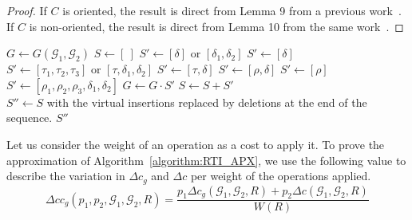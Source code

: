 \documentclass[12pt]{article}
\begin{document}
\begin{proof}
If $C$ is oriented, the result is direct from Lemma 9 from a previous work~\cite{2022b-alexandrino-etal}. If $C$ is non-oriented, the result is direct from Lemma 10 from the same work~\cite{2022b-alexandrino-etal}.
\end{proof}

\begin{algorithm}
\caption{The input is a pair of genomes $\mathcal{G}_1$ and $\mathcal{G}_2$. The output is a sequence $S''$ of reversal, transposition and indel operations such that $\mathcal{G}_1
  \cdot S'' = \mathcal{G}_2$.}\label{algorithm:RTI_APX}
\begin{algorithmic}
\State $G \gets G(\mathcal{G}_1,\mathcal{G}_2)$
\State $S \gets [~]$
        \State $S' \gets [\delta]$ or $[\delta_1, \delta_2]$ 
        \State $S' \gets [\delta]$ 
        \State $S' \gets [\tau_1,\tau_2,\tau_3] \text{ or } [\tau,\delta_1,\delta_2]$ 
        \State $S' \gets [\tau,\delta]$ 
        \State $S' \gets [\rho,\delta]$ 
        \State $S' \gets [\rho]$ 
    \Else
        \State $S' \gets [\rho_1,\rho_2,\rho_3,\delta_1,\delta_2]$ 
    \EndIf
    \State $G \gets G \cdot S'$
    \State $S \gets S + S'$
\EndWhile \\
$S'' \gets S$ with the virtual insertions replaced by deletions at the end of the sequence.
\Return $S''$
\end{algorithmic}
\end{algorithm}

Let us consider the weight of an operation as a cost to apply it. To prove the approximation of Algorithm~\ref{algorithm:RTI_APX}, we use the following value to describe the variation in $\Delta c_g$ and $\Delta c$ per weight of the operations applied.
$$
    \Delta c c_g(p_1,p_2,\mathcal{G}_1,\mathcal{G}_2,R) = \frac{p_1 \Delta c_g(\mathcal{G}_1,\mathcal{G}_2,R) + p_2 \Delta c(\mathcal{G}_1,\mathcal{G}_2,R)}{W(R)}
$$
\end{document}
